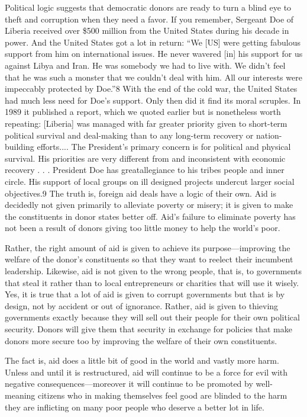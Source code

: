 \documentclass[10pt]{article}
\begin{document}
{\large Political logic suggests that democratic donors are ready to turn a
blind eye to theft and corruption when they need a favor. If you remember,
Sergeant Doe of Liberia received over \$500 million from the United States during
his decade in power. And the United States got a lot in return: ``We [US] were
getting fabulous support from him on international issues. He never wavered [in]
his support for us against Libya and Iran. He was somebody we had to live with.
We didn't feel that he was such a monster that we couldn't deal with him. All our
interests were impeccably protected by Doe.''8 With the end of the cold war, the
United States had much less need for Doe's support. Only then did it find its
moral scruples. In 1989 it published a report, which we quoted earlier but is
nonetheless worth repeating: [Liberia] was managed with far greater priority
given to short-term political survival and deal-making than to any long-term
recovery or nation-building efforts.... The President's primary concern is for
political and physical survival. His priorities are very different from and
inconsistent with economic recovery . . . President Doe has greatallegiance to
his tribes people and inner circle. His support of local groups on ill designed
projects undercut larger social objectives.9 The truth is, foreign aid deals have
a logic of their own. Aid is decidedly not given primarily to alleviate poverty
or misery; it is given to make the constituents in donor states better off. Aid's
failure to eliminate poverty has not been a result of donors giving too little
money to help the world's poor.}

{\large Rather, the right amount of aid is given to achieve its
purpose---improving the welfare of the donor's constituents so that they want to
reelect their incumbent leadership. Likewise, aid is not given to the wrong
people, that is, to governments that steal it rather than to local entrepreneurs
or charities that will use it wisely. Yes, it is true that a lot of aid is given
to corrupt governments but that is by design, not by accident or out of
ignorance. Rather, aid is given to thieving governments exactly because they will
sell out their people for their own political security. Donors will give them
that security in exchange for policies that make donors more secure too by
improving the welfare of their own constituents.}

{\large The fact is, aid does a little bit of good in the world and vastly more
harm. Unless and until it is restructured, aid will continue to be a force for
evil with negative consequences---moreover it will continue to be promoted by
well-meaning citizens who in making themselves feel good are blinded to the harm
they are inflicting on many poor people who deserve a better lot in life.}
\end{document}
